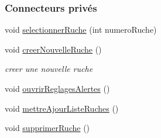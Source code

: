 \subsubsection*{Connecteurs privés}
\begin{DoxyCompactItemize}
\item 
void \hyperlink{class_ruche_ihm_a7324ae6ea574ccdad47783f466933157}{selectionner\+Ruche} (int numero\+Ruche)
\item 
void \hyperlink{class_ruche_ihm_a2a106515c13c06c51799432a1c2baa3b}{creer\+Nouvelle\+Ruche} ()
\begin{DoxyCompactList}\small\item\em creer une nouvelle ruche \end{DoxyCompactList}\item 
void \hyperlink{class_ruche_ihm_ab8db02641e73f348fd6162321a3765da}{ouvrir\+Reglages\+Alertes} ()
\item 
void \hyperlink{class_ruche_ihm_a77cb005fde7e2271e8721c23cef13b3e}{mettre\+Ajour\+Liste\+Ruches} ()
\item 
void \hyperlink{class_ruche_ihm_a85729b1ae4f3dfb5130eb45f5a426e3c}{supprimer\+Ruche} ()
\end{DoxyCompactItemize}
